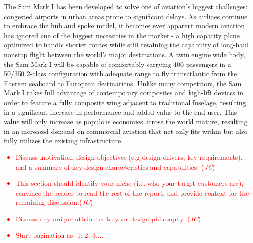 The Sam Mark I has been developed to solve one of aviation's biggest challenges: congested airports in urban areas prone to significant delays.  As airlines continue to embrace the hub and spoke model, it becomes ever apparent modern aviation has ignored one of the biggest necessities in the market - a high capacity plane optimized to handle shorter routes while still retaining the capability of long-haul nonstop flight between the world's major destinations. A twin engine wide body, the Sam Mark I will be capable of comfortably carrying 400 passengers in a 50/350 2-class configuration with adequate range to fly transatlantic from the Eastern seaboard to European destinations.  Unlike many competitors, the Sam Mark I takes full advantage of contemporary composites and high-lift devices in order to feature a fully composite wing adjacent to traditional fuselage, resulting in a significant increase in performance and added value to the end user.  This value will only increase as populous economies across the world mature, resulting in an increased demand on commercial aviation that not only fits within but also fully utilizes the existing infrastructure. 


\textcolor{red}{
\begin{itemize}
    \item Discuss motivation, design objectives (e.g design drivers, key requirements), and a summary of key design characteristics and capabilities. \checkmark (\textit{JC})
    \item This section should identify your niche (i.e. who your target customers are), convince the reader to read the rest of the report, and provide context for the remaining discussion.\checkmark (\textit{JC}) 
    \item Discuss any unique attributes to your design philosophy. \checkmark (\textit{JC})
    \item Start pagination as: 1, 2, 3,... \checkmark
\end{itemize}}